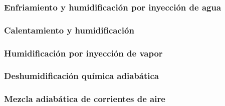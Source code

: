     \subsubsection{Enfriamiento y humidificación por inyección de agua}

    \subsubsection{Calentamiento y humidificación}

    \subsubsection{Humidificación por inyección de vapor}

    \subsubsection{Deshumidificación química adiabática}

    \subsubsection{Mezcla adiabática de corrientes de aire}
